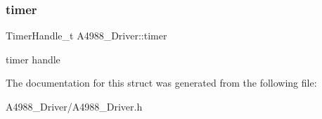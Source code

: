 \subsubsection{\texorpdfstring{timer}{timer}}
{\footnotesize\ttfamily Timer\+Handle\+\_\+t A4988\+\_\+\+Driver\+::timer}

timer handle 

The documentation for this struct was generated from the following file\+:\begin{DoxyCompactItemize}
\item 
A4988\+\_\+\+Driver/A4988\+\_\+\+Driver.\+h\end{DoxyCompactItemize}
